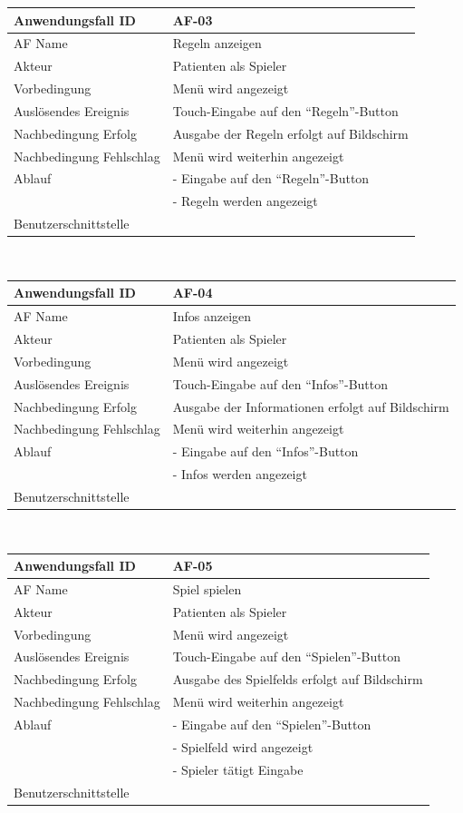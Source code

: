 \documentclass[12pt]{article}
\begin{document}
\begin{tabularx}{\textwidth}{|l|X|} \hline
Anwendungsfall ID&AF-03\\ \hline
AF Name&Regeln anzeigen\\ \hline
Akteur&Patienten als Spieler\\ \hline
Vorbedingung&Menü wird angezeigt\\ \hline
Auslösendes Ereignis&Touch-Eingabe auf den "`Regeln"'-\Gls{Button}\\ \hline
Nachbedingung Erfolg&Ausgabe der Regeln erfolgt auf Bildschirm\\ \hline
Nachbedingung Fehlschlag&Menü wird weiterhin angezeigt\\ \hline
Ablauf&- Eingabe auf den "`Regeln"'-\Gls{Button}\\&- Regeln werden angezeigt\\ \hline
Benutzerschnittstelle& \\ \hline
\end{tabularx}\\

\begin{tabularx}{\textwidth}{|l|X|} \hline
Anwendungsfall ID&AF-04\\ \hline
AF Name&Infos anzeigen\\ \hline
Akteur&Patienten als Spieler\\ \hline
Vorbedingung&Menü wird angezeigt\\ \hline
Auslösendes Ereignis&Touch-Eingabe auf den "`Infos"'-\Gls{Button}\\ \hline
Nachbedingung Erfolg&Ausgabe der Informationen erfolgt auf Bildschirm\\ \hline
Nachbedingung Fehlschlag&Menü wird weiterhin angezeigt\\ \hline
Ablauf&- Eingabe auf den "`Infos"'-\Gls{Button}\\&- Infos werden angezeigt\\ \hline
Benutzerschnittstelle&\\ \hline
\end{tabularx}\\

\begin{tabularx}{\textwidth}{|l|X|} \hline
Anwendungsfall ID&AF-05\\ \hline
AF Name&Spiel spielen\\ \hline
Akteur&Patienten als Spieler\\ \hline
Vorbedingung&Menü wird angezeigt\\ \hline
Auslösendes Ereignis&Touch-Eingabe auf den "`Spielen"'-\Gls{Button}\\ \hline
Nachbedingung Erfolg&Ausgabe des Spielfelds erfolgt auf Bildschirm\\ \hline
Nachbedingung Fehlschlag&Menü wird weiterhin angezeigt\\ \hline
Ablauf&- Eingabe auf den "`Spielen"'-\Gls{Button}\\&- Spielfeld wird angezeigt\\&- Spieler tätigt Eingabe\\ \hline
Benutzerschnittstelle&\\ \hline
\end{tabularx}\\
\end{document}
